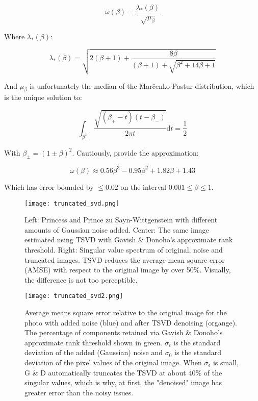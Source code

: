 \begin{equation}
\omega(\beta) = \frac{\lambda_{*}(\beta)}{\sqrt{\mu_{\beta}}}
\end{equation}

Where $\lambda_{*}(\beta)$:

\begin{equation}
\lambda_{*}(\beta) = \sqrt{2(\beta+1) + \frac{8\beta}{(\beta+1)+\sqrt{\beta^2 + 14\beta+1}}} 
\end{equation}

And $\mu_{\beta}$ is unfortunately the median of the Mar\v{c}enko-Pastur distribution, which is the unique solution to:

\begin{equation}
\int_{\beta_{-}^x}\frac{\sqrt{(\beta_{+}-t)(t-\beta_{-})}}{2\pi t} \mathrm{d}t = \frac{1}{2}
\end{equation}

With $\beta_{\pm} = (1\pm\beta)^2$. Cautiously,  provide the approximation:

\begin{equation}
\omega(\beta) \approx 0.56\beta^3 - 0.95\beta^2 + 1.82\beta + 1.43
\end{equation}

Which has error bounded by $\leq0.02$ on the interval $0.001\leq\beta \leq 1$.


\begin{figure}
\centering
    \texttt{[image: truncated\_svd.png]}
    \caption{Left: Princess and Prince zu Sayn-Wittgenstein with different amounts of Gaussian noise added. Center: The same image estimated using TSVD with Gavish \& Donoho's approximate rank threshold. Right: Singular value spectrum of original, noise and truncated images. TSVD reduces the average mean square error (AMSE) with respect to the original image by over 50\%. Visually, the difference is not too perceptible.}
    \label{fig:truncated_svd}
\end{figure}


\begin{figure}
\centering
    \texttt{[image: truncated\_svd2.png]}
    \caption{Average means square error relative to the original image for the photo with added noise (blue) and after TSVD denoising (organge). The percentage of components retained via Gavish \& Donoho's approximate rank threshold shown in green. $\sigma_{\epsilon}$ is the standard deviation of the added (Gaussian) noise and $\sigma_0$ is the standard deviation of the pixel values of the original image. When $\sigma_{\epsilon}$ is small, G \& D automatically truncates the TSVD at about 40\% of the singular values, which is why, at first, the "denoised" image has greater error than the noisy issues.}
    \label{fig:truncated_svd}	
\end{figure}
